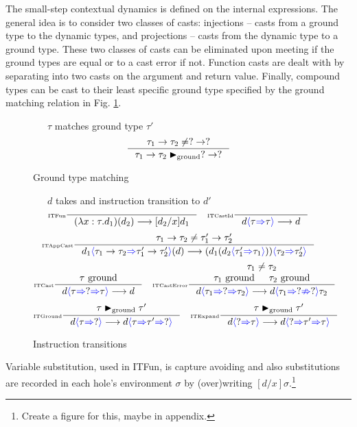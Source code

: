 The small-step contextual dynamics \cite{PracticalFoundations} is defined on the internal expressions. The general idea is to consider two classes of casts: injections -- casts from a ground type to the dynamic types, and projections -- casts from the dynamic type to a ground type. These two classes of casts can be eliminated upon meeting if the ground types are equal or to a cast error if not. Function casts are dealt with by separating into two casts on the argument and return value. Finally, compound types can be cast to their least specific ground type specified by the ground matching relation in Fig. \ref{fig:groundmatch}.

\begin{figure}[H]
\small
{}\ \ \ $\tau$ matches ground type $\tau'$
\tiny
\[\inference[\tiny]{\tau_1 \to \tau_2 \neq ? \to ?}{\tau_1 \to \tau_2 \groundmatch ? \to ?}\]
\caption{Ground type matching}
\label{fig:groundmatch}
\end{figure}

\begin{figure}[H]
\small
{}\ \ \ $d$ takes and instruction transition to $d'$
\tiny
\[\inference[\tiny ITFun]{}{(\lambda x:\tau. d_1)(d_2) \longrightarrow [d_2/x]d_1}\quad
\inference[\tiny ITCastId]{}{d\scast{\tau}{\tau} \longrightarrow d}\]
\[\inference[\tiny ITAppCast]{\tau_1 \to \tau_2 \neq \tau_1' \to \tau_2'}{d_1\scast{\tau_1 \to \tau_2}{\tau_1' \to \tau_2'}(d) \longrightarrow (d_1(d_2\scast{\tau_1'}{\tau_1}))\scast{\tau_2}{\tau_2'}}\]
\[\inference[\tiny ITCast]{\ground}{d\scastcast{\tau}{?}{\tau} \longrightarrow d} \quad
\inference[\tiny ITCastError]{\tau_1 \neq \tau_2 \\ \ground[\tau_1] & \ground[\tau_2]}{d\scastcast{\tau_1}{?}{\tau_2}\longrightarrow d\scasterror{\tau_1}{?}{\tau_2}}\]
\[\inference[\tiny ITGround]{\tau \groundmatch \tau'}{d\scast{\tau}{?} \longrightarrow d\scastcast{\tau}{\tau'}{?}}\quad
\inference[\tiny ITExpand]{\tau \groundmatch \tau'}{d\scast{?}{\tau} \longrightarrow d\scastcast{?}{\tau'}{\tau}}\]
\caption{Instruction transitions}
\label{fig:instructions}
\end{figure}

Variable substitution, used in ITFun, is capture avoiding and also substitutions are recorded in each hole's environment $\sigma$ by (over)writing $[d/x]\sigma$.\footnote{Create a figure for this, maybe in appendix.}

